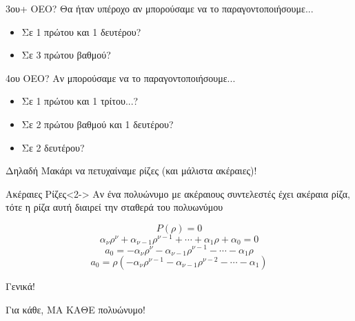 \documentclass[greek]{beamer}
\begin{document}
\begin{frame}{3ου+ ΟΕΟ?}
 Θα ήταν υπέροχο αν μπορούσαμε να το παραγοντοποιήσουμε...
 \begin{itemize}
  \item<1-> Σε 1 πρώτου και 1 δευτέρου?
  \item<2-> Σε 3 πρώτου βαθμού?
 \end{itemize}
\end{frame}

\begin{frame}{4ου ΟΕΟ?}
 Αν μπορούσαμε να το παραγοντοποιήσουμε...
 \begin{itemize}
  \item<1-> Σε 1 πρώτου και 1 τρίτου...?
  \item<2-> Σε 2 πρώτου βαθμού και 1 δευτέρου?
  \item<3-> Σε 2 δευτέρου?
 \end{itemize}
\end{frame}

\begin{frame}{Δηλαδή}
 Μακάρι να πετυχαίναμε ρίζες (και μάλιστα ακέραιες)!
 \begin{block}{Ακέραιες Ρίζες}<2->
  Αν ένα πολυώνυμο με ακέραιους συντελεστές έχει ακέραια ρίζα, τότε η ρίζα αυτή διαιρεί την σταθερά του πολυωνύμου
 \end{block}
 {$$P(ρ)=0$$ $$α_νρ^ν+α_{ν-1}ρ^{ν-1}+\cdots+α_1ρ+α_0=0$$ $$a_0=-α_νρ^ν-α_{ν-1}ρ^{ν-1}-\cdots-α_1ρ $$ $$a_0=ρ(-α_νρ^{ν-1}-α_{ν-1}ρ^{ν-2}-\cdots-α_1)$$}

\end{frame}

\begin{frame}{Γενικά!}


 Για κάθε, ΜΑ ΚΑΘΕ πολυώνυμο!
\end{frame}
\end{document}
